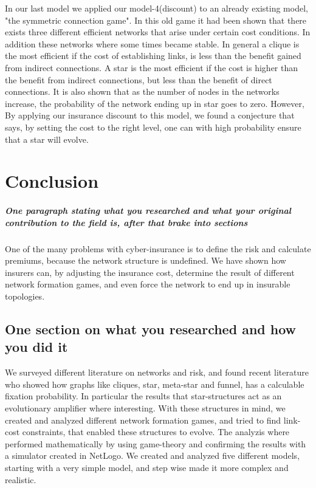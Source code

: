 In our last model we applied our model-4(discount) to an already existing model, "the symmetric connection game". In this old game it had been shown that there exists three different efficient networks that arise under certain cost conditions. In addition these networks where some times became stable. In general a clique is the most efficient if the cost of establishing links, is less than the benefit gained from indirect connections. A star is the most efficient if the cost is higher than the benefit from indirect connections, but less than the benefit of direct connections. 
It is also shown that as the number of nodes in the networks increase, the probability of the network ending up in star goes to zero. However, By applying our insurance discount to this model, we found a conjecture that says, by setting the cost to the right level, one can with high probability ensure that a star will evolve. 




\section{Conclusion}
\subparagraph{One paragraph stating what you researched and what your original contribution to the field is, after that brake into sections}
One of the many problems with cyber-insurance is to define the risk and calculate premiums, because the network structure is undefined. We have shown how insurers can, by adjusting the insurance cost, determine the result of different network formation games, and even force the network to end up in insurable topologies.  
\subsection{One section on what you researched and how you did it}
We surveyed different literature on networks and risk, and found recent literature who showed how graphs like cliques, star, meta-star and funnel, has a calculable fixation probability. In particular the results that star-structures act as an evolutionary amplifier where interesting. 
With these structures in mind, we created and analyzed different network formation games, and tried to find link-cost constraints, that enabled these structures to evolve. 
The analyzis where performed mathematically by using game-theory and confirming the results with a simulator created in NetLogo.
We created and analyzed five different models, starting with a very simple model, and step wise made it more complex and realistic. 
